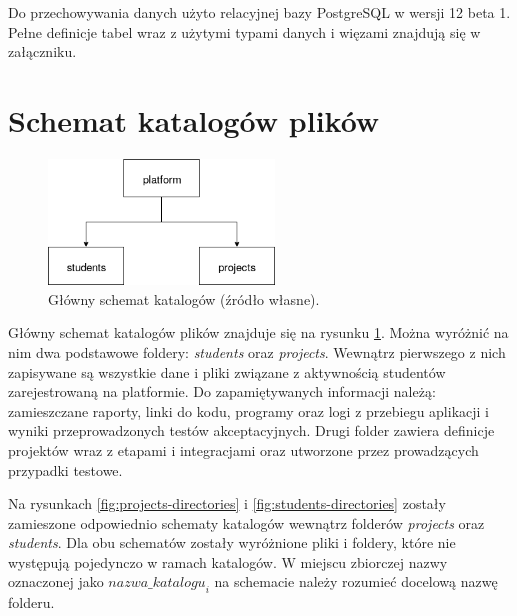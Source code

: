 Do przechowywania danych użyto relacyjnej bazy PostgreSQL w wersji 12 beta 1.
Pełne definicje tabel wraz z użytymi typami danych i więzami znajdują się w załączniku.


\section{Schemat katalogów plików}
\label{directories}

\begin{figure}[h]
    \centering
    \includegraphics[width = 6cm]{chapter05/platform_main_dirs.png}
    \caption{Główny schemat katalogów (źródło własne).}
    \label{fig:platform-main-directories}
\end{figure}

Główny schemat katalogów plików znajduje się na rysunku \ref{fig:platform-main-directories}.
Można wyróżnić na nim dwa podstawowe foldery: \textit{students} oraz \textit{projects}.
Wewnątrz pierwszego z nich zapisywane są wszystkie dane i pliki związane z aktywnością studentów zarejestrowaną na platformie.
Do zapamiętywanych informacji należą: zamieszczane raporty, linki do kodu, programy oraz logi z przebiegu aplikacji i wyniki przeprowadzonych testów akceptacyjnych.
Drugi folder zawiera definicje projektów wraz z etapami i integracjami oraz utworzone przez prowadzących przypadki testowe.

Na rysunkach \ref{fig:projects-directories} i \ref{fig:students-directories} zostały zamieszone odpowiednio schematy katalogów wewnątrz folderów \textit{projects} oraz \textit{students}.
Dla obu schematów zostały wyróżnione pliki i foldery, które nie występują pojedynczo w ramach katalogów.
W miejscu zbiorczej nazwy oznaczonej jako ${nazwa\_katalogu}_{i}$ na schemacie należy rozumieć docelową nazwę folderu.


